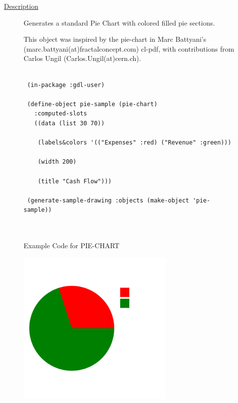 \documentclass [11pt]{book}
\begin{document}
\begin{itemize}
\begin{description}
\item [
\underline{Description}]


Generates a standard Pie Chart with colored filled pie sections.

This object was inspired by the pie-chart in Marc Battyani's (marc.battyani(at)fractalconcept.com)
cl-pdf, with contributions from Carlos Ungil (Carlos.Ungil(at)cern.ch).



\end{description}




\begin{figure}
\begin{lrbox}{\boxedverb}
\begin{minipage}{\linewidth}
{\small

\begin{verbatim}

 (in-package :gdl-user)
 
 (define-object pie-sample (pie-chart)
   :computed-slots
   ((data (list 30 70))
   
    (labels&colors '(("Expenses" :red) ("Revenue" :green)))
   
    (width 200) 
   
    (title "Cash Flow")))

 (generate-sample-drawing :objects (make-object 'pie-sample))

 
\end{verbatim}}
\end{minipage}
\end{lrbox}
\fbox{\usebox{\boxedverb}}

\caption{Example Code for PIE-CHART}

\label{fig:example-code-PIE-CHART}

\end{figure}

\begin{figure}
\begin{center}
\includegraphics[width=3in,height=3in]{../images/example-PIE-CHART.pdf}
\end{center}


\end{figure}
\end{itemize}
\end{document}
